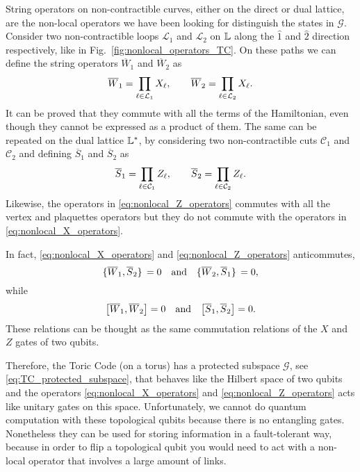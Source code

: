String operators on non-contractible curves, either on the direct or dual lattice, are the non-local operators we have been looking for distinguish the states in $\mathcal{G}$.
Consider two non-contractible loops $\mathcal{L}_{1}$ and $\mathcal{L}_{2}$ on $\mathbb{L}$ along the $\hat{1}$ and $\hat{2}$ direction respectively, like in Fig.~\ref{fig:nonlocal_operators_TC}.
On these paths we can define the string operators $\overline{W}_1$ and $\overline{W}_2$ as
\begin{equation}
    \overline{W}_1 = \prod_{\ell \in \mathcal{L}_1} X_\ell, \qquad
    \overline{W}_2 = \prod_{\ell \in \mathcal{L}_2} X_\ell.
    \label{eq:nonlocal_X_operators}
\end{equation}
It can be proved that they commute with all the terms of the Hamiltonian, even though they cannot be expressed as a product of them.
The same can be repeated on the dual lattice $\mathbb{L}^{\ast}$, by considering two non-contractible cuts $\mathcal{C}_1$ and $\mathcal{C}_2$ and defining $\overline{S}_1$ and $\overline{S}_2$ as
\begin{equation}
    \overline{S}_1 = \prod_{\ell \in \mathcal{C}_1} Z_\ell, \qquad
    \overline{S}_2 = \prod_{\ell \in \mathcal{C}_2} Z_\ell.
    \label{eq:nonlocal_Z_operators}
\end{equation}
Likewise, the operators in \eqref{eq:nonlocal_Z_operators} commutes with all the vertex and plaquettes operators but they do not commute with the operators in \eqref{eq:nonlocal_X_operators}.

In fact, \eqref{eq:nonlocal_X_operators} and \eqref{eq:nonlocal_Z_operators} anticommutes,
\begin{equation}
    \acomm*{\overline{W}_1}{\overline{S}_2} = 0 \qand
    \acomm*{\overline{W}_2}{\overline{S}_1} = 0,
    \label{eq:anticommutation_W_S_toric}
\end{equation}
while
\begin{equation}
    \comm{\overline{W}_1}{\overline{W}_2} = 0 \qand
    \comm{\overline{S}_1}{\overline{S}_2} = 0.
\end{equation}
These relations can be thought as the same commutation relations of the $X$ and $Z$ gates of two qubits.

Therefore, the Toric Code (on a torus) has a protected subspace $\mathcal{G}$, see \eqref{eq:TC_protected_subspace}, that behaves like the Hilbert space of two qubits and the operators \eqref{eq:nonlocal_X_operators} and \eqref{eq:nonlocal_Z_operators} acts like unitary gates on this space.
Unfortunately, we cannot do quantum computation with these topological qubits because there is no entangling gates.
Nonetheless they can be used for storing information in a fault-tolerant way, because in order to flip a topological qubit you would need to act with a non-local operator that involves a large amount of links.


